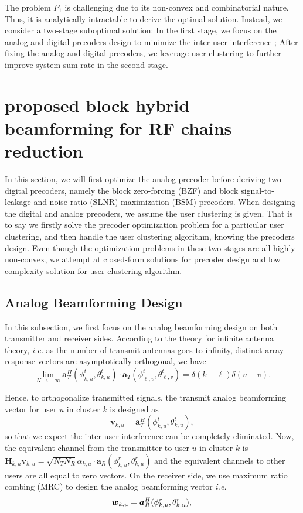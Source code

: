 \documentclass[conference]{IEEEtran}
\begin{document}
{The problem $P_1$ is challenging due to its non-convex and combinatorial nature. Thus, it is analytically intractable to derive the optimal solution. Instead, we consider a two-stage suboptimal solution: In the first stage, we focus on the analog  and digital precoders design to minimize the inter-user interference ; After fixing the analog and digital precoders, we leverage user clustering to further improve system sum-rate in the second stage.

\section{proposed block hybrid beamforming for RF chains reduction}
In this section, we will first optimize the analog precoder before deriving two digital precoders, namely the block zero-forcing (BZF) and block signal-to-leakage-and-noise ratio (SLNR) maximization (BSM) precoders. When designing the digital and analog precoders, we assume the user clustering is given. That is to say we firstly solve the precoder optimization problem for a particular user clustering, and then handle the user clustering algorithm, knowing the precoders design. Even though the optimization problems in these two stages are all highly non-convex, we attempt at closed-form solutions for precoder design and low complexity solution for user clustering algorithm.

\subsection{Analog Beamforming Design}\label{analog}
In this subsection, we first focus on the analog beamforming design on both transmitter and receiver sides. According to the theory for infinite antenna theory, \textit{i.e.} as the number of transmit antennas goes to infinity, distinct array response vectors are asymptotically orthogonal, we have
\begin{equation}\label{Eq:assumption}
\lim_{N\rightarrow +\infty} \bm{a}_{T}^{H}(\phi^t_{k,u},\theta^t_{k,u}) \cdot\bm{a}_{T}(\phi^t_{\ell,v},\theta^t_{\ell,v})=\delta(k-\ell)\delta(u-v).
\end{equation}

Hence, to orthogonalize transmitted signals,  the transmit analog beamforming vector for user $u$ in cluster $k$ is designed as
\begin{equation}
\bm{v}_{k,u}=\bm{a}_{T}^{H}(\phi^t_{k,u},\theta^t_{k,u}),
\label{eq:vku}
\end{equation}
so that we expect the inter-user interference can be completely eliminated. Now, the equivalent channel from the transmitter to user $u$ in cluster $k$ is $\bm{H}_{k,u}\bm{v}_{k,u}=\sqrt{N_{T}N_{R}}\alpha_{k,u}\cdot \bm{a}_{R}(\phi^r_{k,u},\theta^r_{k,u})$ and the equivalent channels to other users are all equal to zero vectors. On the receiver side, we use maximum ratio combing (MRC) to design the analog beamforming vector \textit{i.e.}
\begin{equation}
\bm{w}_{k,u}=\bm{a}_{R}^{H}(\phi^r_{k,u},\theta^r_{k,u}),\\
\label{eq:wku}
\end{equation}

}
\end{document}
